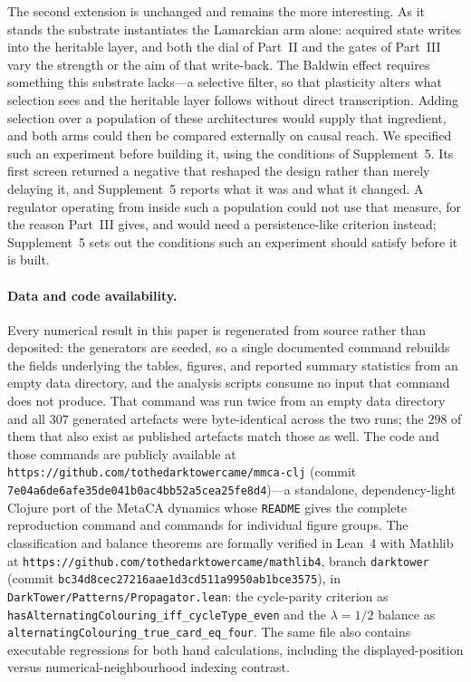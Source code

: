 \documentclass[man,12pt,floatsintext,donotrepeattitle]{apa7}
\begin{document}
The second extension is unchanged and remains the more interesting. As it stands the
substrate instantiates the Lamarckian arm alone: acquired state writes into the
heritable layer, and both the dial of Part~II and the gates of Part~III vary the
strength or the aim of that write-back. The Baldwin effect requires something this
substrate lacks---a selective filter, so that plasticity alters what selection sees and
the heritable layer follows without direct transcription. Adding selection over a
population of these architectures would supply that ingredient, and both arms could then
be compared externally on causal reach. We specified such an experiment before
building it, using the conditions of Supplement~5. Its first screen returned a negative
that reshaped the design rather than merely delaying it, and Supplement~5 reports what it
was and what it changed. A regulator operating from inside such a
population could not use that measure, for the reason Part~III gives, and would need a
persistence-like criterion instead; Supplement~5 sets out the conditions such an
experiment should satisfy before it is built.

\paragraph{Data and code availability.} Every numerical result in this paper is
regenerated from source rather than deposited: the generators are seeded, so a
single documented command rebuilds the fields underlying the tables, figures,
and reported summary statistics from an empty data directory, and the analysis
scripts consume no input that command does not produce. That command was run
twice from an empty data directory and all $307$ generated artefacts were
byte-identical across the two runs; the $298$ of them that also exist as
published artefacts match those as well. The code and those
commands are publicly available at
\texttt{https://github.com/tothedarktowercame/mmca-clj} (commit
\texttt{7e04a6de6afe35de041b0ac4bb52a5cea25fe8d4})---a standalone,
dependency-light Clojure port of the MetaCA dynamics whose \texttt{README} gives
the complete reproduction command and commands for individual figure groups.
The classification and balance theorems are
formally verified in Lean~4 with Mathlib at
\texttt{https://github.com/tothedarktowercame/mathlib4}, branch \texttt{darktower}
(commit \texttt{bc34d8cec27216aae1d3cd511a9950ab1bce3575}), in
\texttt{DarkTower/Patterns/Propagator.lean}: the cycle-parity criterion as
\texttt{hasAlternatingColouring\_iff\_cycleType\_even} and the $\lambda = 1/2$
balance as \texttt{alternatingColouring\_true\_card\_eq\_four}. The same file
also contains executable regressions for both hand calculations, including the
displayed-position versus numerical-neighbourhood indexing contrast.
\end{document}
